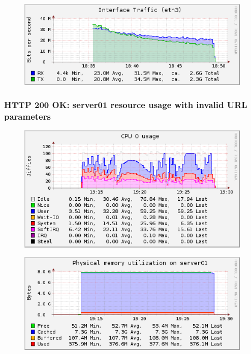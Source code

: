 \documentclass[Measurement results]{subfiles}
\begin{document}
\begin{figure}[H]
\centering
\includegraphics[scale=0.7]{images/results/200_with_naxsi_incremented_allowed_parameters/interface.png}
\end{figure}

\newpage
\subsubsection{HTTP 200 OK: server01 resource usage with invalid URL parameters}
\begin{figure}[H]
\centering
\includegraphics[scale=0.7]{images/results/200_with_naxsi_incremented_disallowed_parameters/cpu.png}
\end{figure}

\begin{figure}[H]
\centering
\includegraphics[scale=0.7]{images/results/200_with_naxsi_incremented_disallowed_parameters/memory.png}
\end{figure}
\end{document}
